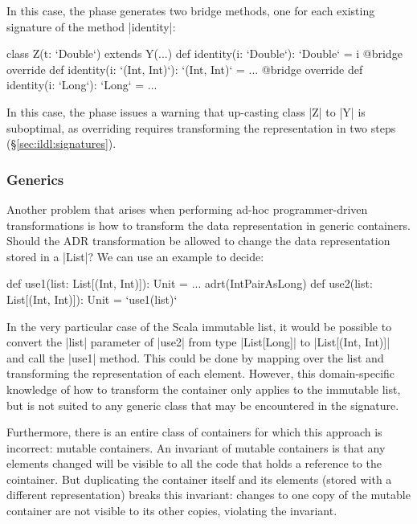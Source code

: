 In this case, the \bridge{} phase generates two bridge methods, one for each existing signature of the method |identity|:

\begin{lstlisting-nobreak}
class Z(t: `Double`) extends Y(...) {
  def identity(i: `Double`): `Double` = i
  @bridge override def identity(i: `(Int, Int)`): `(Int, Int)` = ...
  @bridge override def identity(i: `Long`): `Long` = ...
}
\end{lstlisting-nobreak}


In this case, the \bridge{} phase issues a warning that up-casting class |Z| to |Y| is suboptimal, as overriding requires transforming the representation in two steps (\S\ref{sec:ildl:signatures}).

\subsubsection{Generics}
Another problem that arises when performing ad-hoc programmer-driven transformations is how to transform the data representation in generic containers. Should the ADR transformation be allowed to change the data representation stored in a |List|? We can use an example to decide:

\begin{lstlisting-nobreak}
def use1(list: List[(Int, Int)]): Unit = ...
adrt(IntPairAsLong) {
  def use2(list: List[(Int, Int)]): Unit = `use1(list)`
}
\end{lstlisting-nobreak}

In the very particular case of the Scala immutable list, it would be possible to convert the |list| parameter of |use2| from type |List[Long]| to |List[(Int, Int)]| and call the |use1| method. This could be done by mapping over the list and transforming the representation of each element. However, this domain-specific knowledge of how to transform the container only applies to the immutable list, but is not suited to any generic class that may be encountered in the signature.

Furthermore, there is an entire class of containers for which this approach is incorrect: mutable containers. An invariant of mutable containers is that any elements changed will be visible to all the code that holds a reference to the cointainer. But duplicating the container itself and its elements (stored with a different representation) breaks this invariant: changes to one copy of the mutable container are not visible to its other copies, violating the invariant.

